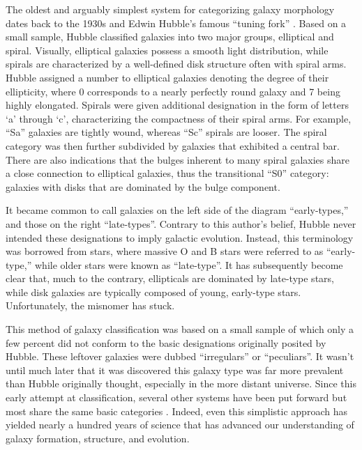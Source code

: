 The oldest and arguably simplest system for categorizing galaxy morphology dates back to the 1930s and Edwin Hubble's famous ``tuning fork'' \citep{Hubble1926, Hubble1936}. Based on a small sample, Hubble classified galaxies into two major groups, elliptical and spiral. Visually, elliptical galaxies possess a smooth light distribution, while spirals are characterized by a well-defined disk structure often with spiral arms. Hubble assigned a number to elliptical galaxies denoting the degree of their ellipticity, where 0 corresponds to a nearly perfectly round galaxy and 7 being highly elongated. Spirals were given additional designation in the form of letters `a' through `c', characterizing the compactness of their spiral arms. For example, ``Sa'' galaxies are tightly wound, whereas ``Sc'' spirals are looser. The spiral category was then further subdivided by galaxies that exhibited a central bar. There are also indications that the bulges inherent to many spiral galaxies share a close connection to elliptical galaxies, thus the transitional ``S0'' category: galaxies with disks that are dominated by the bulge component. 

It became common to call galaxies on the left side of the diagram ``early-types,'' and those on the right ``late-types''. Contrary to this author's belief, Hubble never intended these designations to imply galactic evolution. Instead, this terminology was borrowed from stars, where massive O and B stars were referred to as ``early-type,'' while older stars were known as ``late-type''\citep{Buta2011}. It has subsequently become clear that, much to the contrary, ellipticals are dominated by late-type stars, while disk galaxies are typically composed of young, early-type stars.  Unfortunately, the misnomer has stuck. 


This method of galaxy classification was based on a small sample of which only a few percent did not conform to the basic designations originally posited by Hubble. These leftover galaxies were dubbed ``irregulars'' or ``peculiars''. It wasn't until much later that it was discovered this galaxy type was far more prevalent than Hubble originally thought, especially in the more distant universe. Since this early attempt at classification, several other systems have been put forward but most share the same basic categories \citep[e.g.,][]{deVaucouleurs1959, Conselice2006}. Indeed, even this simplistic approach has yielded nearly a hundred years of science that has advanced our understanding of galaxy formation, structure, and evolution. 
 

